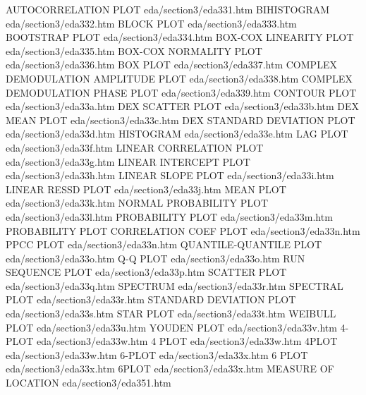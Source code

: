 AUTOCORRELATION PLOT                    eda/section3/eda331.htm
BIHISTOGRAM                             eda/section3/eda332.htm
BLOCK PLOT                              eda/section3/eda333.htm
BOOTSTRAP PLOT                          eda/section3/eda334.htm
BOX-COX LINEARITY PLOT                  eda/section3/eda335.htm
BOX-COX NORMALITY PLOT                  eda/section3/eda336.htm
BOX PLOT                                eda/section3/eda337.htm
COMPLEX DEMODULATION AMPLITUDE PLOT     eda/section3/eda338.htm
COMPLEX DEMODULATION PHASE PLOT         eda/section3/eda339.htm
CONTOUR PLOT                            eda/section3/eda33a.htm
DEX SCATTER PLOT                        eda/section3/eda33b.htm
DEX MEAN PLOT                           eda/section3/eda33c.htm
DEX STANDARD DEVIATION PLOT             eda/section3/eda33d.htm
HISTOGRAM                               eda/section3/eda33e.htm
LAG PLOT                                eda/section3/eda33f.htm
LINEAR CORRELATION PLOT                 eda/section3/eda33g.htm
LINEAR INTERCEPT PLOT                   eda/section3/eda33h.htm
LINEAR SLOPE PLOT                       eda/section3/eda33i.htm
LINEAR RESSD PLOT                       eda/section3/eda33j.htm
MEAN PLOT                               eda/section3/eda33k.htm
NORMAL PROBABILITY PLOT                 eda/section3/eda33l.htm
PROBABILITY PLOT                        eda/section3/eda33m.htm
PROBABILITY PLOT CORRELATION COEF PLOT  eda/section3/eda33n.htm
PPCC PLOT                               eda/section3/eda33n.htm
QUANTILE-QUANTILE PLOT                  eda/section3/eda33o.htm
Q-Q PLOT                                eda/section3/eda33o.htm
RUN SEQUENCE PLOT                       eda/section3/eda33p.htm
SCATTER PLOT                            eda/section3/eda33q.htm
SPECTRUM                                eda/section3/eda33r.htm
SPECTRAL PLOT                           eda/section3/eda33r.htm
STANDARD DEVIATION PLOT                 eda/section3/eda33s.htm
STAR PLOT                               eda/section3/eda33t.htm
WEIBULL PLOT                            eda/section3/eda33u.htm
YOUDEN PLOT                             eda/section3/eda33v.htm
4-PLOT                                  eda/section3/eda33w.htm
4 PLOT                                  eda/section3/eda33w.htm
4PLOT                                   eda/section3/eda33w.htm
6-PLOT                                  eda/section3/eda33x.htm
6 PLOT                                  eda/section3/eda33x.htm
6PLOT                                   eda/section3/eda33x.htm
MEASURE OF LOCATION                     eda/section3/eda351.htm
